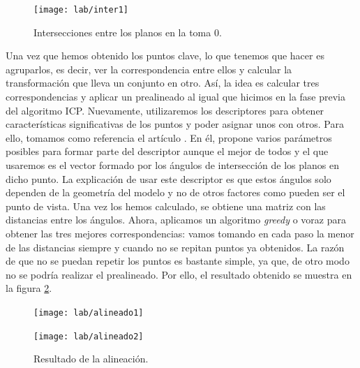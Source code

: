\begin{figure}[h!]
	\centering
	\texttt{[image: lab/inter1]} 
	\caption{Intersecciones entre los planos en la toma 0.}
	\label{fig:inter1}
\end{figure}

Una vez que hemos obtenido los puntos clave, lo que tenemos que hacer es agruparlos, es decir, ver la correspondencia entre ellos y calcular la transformación que lleva un conjunto en otro. Así, la idea es calcular tres correspondencias y aplicar un prealineado al igual que hicimos en la fase previa del algoritmo ICP. Nuevamente, utilizaremos los descriptores para obtener características significativas de los puntos y poder asignar unos con otros. Para ello, tomamos como referencia el artículo \cite{theiler2012automatic}. En él, propone varios parámetros posibles para formar parte del descriptor aunque el mejor de todos y el que usaremos es el vector formado por los ángulos de intersección de los planos en dicho punto. La explicación de usar este descriptor es que estos ángulos solo dependen de la geometría del modelo y no de otros factores como pueden ser el punto de vista. Una vez los hemos calculado, se obtiene una matriz con las distancias entre los ángulos. Ahora, aplicamos un algoritmo \textit{greedy} o voraz para obtener las tres mejores correspondencias: vamos tomando en cada paso la menor de las distancias siempre y cuando no se repitan puntos ya obtenidos. La razón de que no se puedan repetir los puntos es bastante simple, ya que, de otro modo no se podría realizar el prealineado.  Por ello, el resultado obtenido se muestra en la figura \ref{fig:lab-alineado}. \\

\begin{figure}[h!]
	\centering
	\begin{minipage}{0.6\textwidth}
		\centering
		\texttt{[image: lab/alineado1]} 
	\end{minipage}
	\centering
	\begin{minipage}{0.6\textwidth}
		\centering
		\texttt{[image: lab/alineado2]} 
	\end{minipage}
	\caption{Resultado de la alineación.}
	\label{fig:lab-alineado}
\end{figure}

